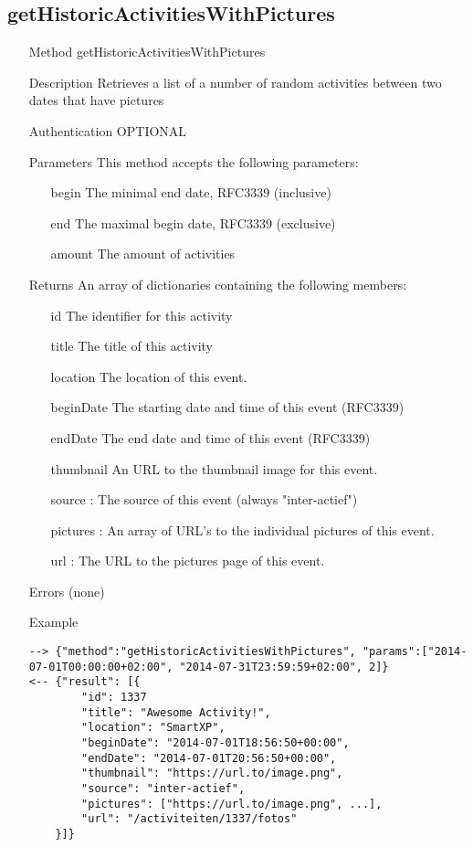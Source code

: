 \documentclass[a4paper]{scrreprt}
\begin{document}
\subsection{getHistoricActivitiesWithPictures}
\begin{enumerate}
\item[Method] getHistoricActivitiesWithPictures
\item[Description] Retrieves a list of a number of random activities between two dates that have pictures
\item[Authentication] OPTIONAL
\item[Parameters] This method accepts the following parameters:
\begin{enumerate}
    \item[begin] The minimal end date, RFC3339 (inclusive)
    \item[end] The maximal begin date, RFC3339 (exclusive)
    \item[amount] The amount of activities
    \end{enumerate}
\item[Returns] An array of dictionaries containing the following members:
\begin{enumerate}
    \item[id] The identifier for this activity
    \item[title] The title of this activity
    \item[location] The location of this event.
    \item[beginDate] The starting date and time of this event (RFC3339)
    \item[endDate] The end date and time of this event (RFC3339)
    \item[thumbnail] An URL to the thumbnail image for this event.
    \item[source]: The source of this event (always "inter-actief")
    \item[pictures]: An array of URL's to the individual pictures of this event.
    \item[url]: The URL to the pictures page of this event.
    \end{enumerate}
\item[Errors] (none)
\item[Example]
\begin{lstlisting}
--> {"method":"getHistoricActivitiesWithPictures", "params":["2014-07-01T00:00:00+02:00", "2014-07-31T23:59:59+02:00", 2]}
<-- {"result": [{
        "id": 1337
        "title": "Awesome Activity!",
        "location": "SmartXP",
        "beginDate": "2014-07-01T18:56:50+00:00",
        "endDate": "2014-07-01T20:56:50+00:00",
        "thumbnail": "https://url.to/image.png",
        "source": "inter-actief",
        "pictures": ["https://url.to/image.png", ...],
        "url": "/activiteiten/1337/fotos"
    }]}
\end{lstlisting}
\end{enumerate}
\end{document}
